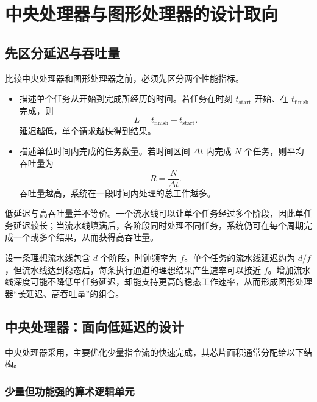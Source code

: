 \section{中央处理器与图形处理器的设计取向}

\subsection{先区分延迟与吞吐量}

比较中央处理器和图形处理器之前，必须先区分两个性能指标。

\begin{itemize}
  \item {}描述单个任务从开始到完成所经历的时间。若任务在时刻 $t_{\mathrm{start}}$ 开始、在 $t_{\mathrm{finish}}$ 完成，则
  \begin{equation*}
    L=t_{\mathrm{finish}}-t_{\mathrm{start}}.
  \end{equation*}
  延迟越低，单个请求越快得到结果。
  \item {}描述单位时间内完成的任务数量。若时间区间 $\Delta t$ 内完成 $N$ 个任务，则平均吞吐量为
  \begin{equation*}
    R=\frac{N}{\Delta t}.
  \end{equation*}
  吞吐量越高，系统在一段时间内处理的总工作越多。
\end{itemize}

低延迟与高吞吐量并不等价。一个流水线可以让单个任务经过多个阶段，因此单任务延迟较长；当流水线填满后，各阶段同时处理不同任务，系统仍可在每个周期完成一个或多个结果，从而获得高吞吐量。

\begin{modelbox}
设一条理想流水线包含 $d$ 个阶段，时钟频率为 $f$。单个任务的流水线延迟约为 $d/f$，但流水线达到稳态后，每条执行通道的理想结果产生速率可以接近 $f$。增加流水线深度可能不降低单任务延迟，却能支持更高的稳态工作速率，从而形成图形处理器“长延迟、高吞吐量”的组合。
\end{modelbox}

\subsection{中央处理器：面向低延迟的设计}

中央处理器采用，主要优化少量指令流的快速完成，其芯片面积通常分配给以下结构。

\subsubsection{少量但功能强的算术逻辑单元}

